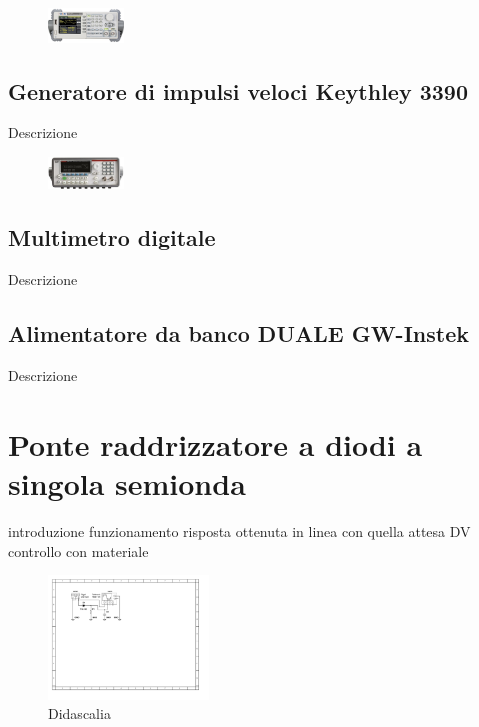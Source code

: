 \documentclass[journal]{IEEEtran}
\begin{document}
\begin{figure}[h!]
  \centering
  \includegraphics[width=0.18\textwidth]{lab-reports/Schematics-and-graphics/SIGLENT Gen.png}
\end{figure}

\subsection{\textbf{Generatore di impulsi veloci Keythley 3390}}
Descrizione

\begin{figure}[h!]
  \centering
  \includegraphics[width=0.18\textwidth]{lab-reports/Schematics-and-graphics/KEIT Gen.png}
\end{figure}

\subsection{\textbf{Multimetro digitale}}
Descrizione

\subsection{\textbf{Alimentatore da banco DUALE GW-Instek}}
Descrizione

\section{\textbf{Ponte raddrizzatore a diodi a singola semionda}} %
introduzione funzionamento 
risposta ottenuta in linea con quella attesa
DV controllo con materiale

\begin{figure}[H]%
\begin {center}
\includegraphics[width=0.38\textwidth]{sch-simulations/output/Diode-rectifier.pdf}
\caption{Didascalia}
\label{fig:oscilloscope}
\end {center}
\end{figure}
\end{document}
